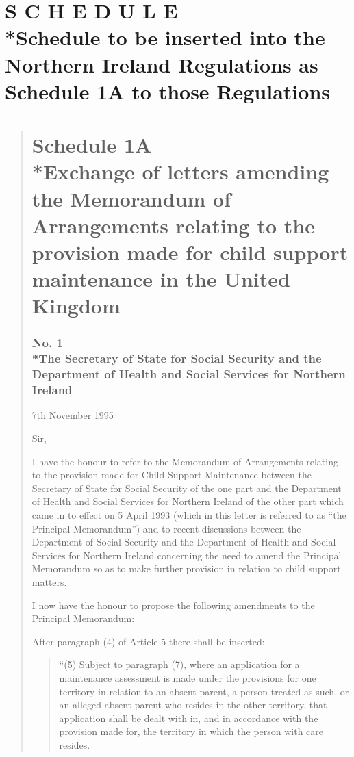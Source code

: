 \documentclass[a4paper]{article}
\newcommand{\parthead}{}
\begin{document}
\part[Schedule --- Schedule to be inserted into the Northern Ireland Regulations as Schedule 1A to those Regulations]{S C H E D U L E\\*Schedule to be inserted into the Northern Ireland Regulations as Schedule 1A to those Regulations}

\renewcommand\parthead{--- Schedule}

\begin{quotation}
\part*{Schedule 1A\\*Exchange of letters amending the Memorandum of Arrangements relating to the provision made for child support maintenance in the United Kingdom}

\section*{\sloppy No. 1\\*The Secretary of State for Social Security and the Department of Health and Social Services for Northern Ireland}

7th November 1995

  Sir,

  I have the honour to refer to the Memorandum of Arrangements relating to the provision made for Child Support Maintenance between the Secretary of State for Social Security of the one part and the Department of Health and Social Services for Northern Ireland of the other part which came in to effect on 5 April 1993 (which in this letter is referred to as “the Principal Memorandum”) and to recent discussions between the Department of Social Security and the Department of Health and Social Services for Northern Ireland concerning the need to amend the Principal Memorandum so as to make further provision in relation to child support matters.

  I now have the honour to propose the following amendments to the Principal Memorandum:

  After paragraph (4) of Article 5 there shall be inserted:—
\begin{quotation}
 “(5) Subject to paragraph (7), where an application for a maintenance assessment is made under the provisions for one territory in relation to an absent parent, a person treated as such, or an alleged absent parent who resides in the other territory, that application shall be dealt with in, and in accordance with the provision made for, the territory in which the person with care resides.


\end{quotation}
\end{quotation}
\end{document}
